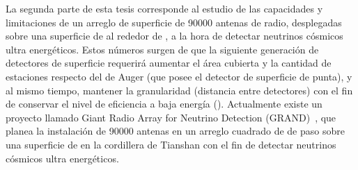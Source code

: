 La segunda parte de esta tesis corresponde al estudio de las capacidades y limitaciones de un arreglo de superficie de 90000 antenas de radio, desplegadas sobre una superficie de al rededor de , a la hora de detectar neutrinos cósmicos ultra energéticos.
Estos números surgen de que la siguiente generación de detectores de superficie requerir\'a aumentar el área cubierta y la cantidad de estaciones respecto del de Auger (que posee el detector de superficie de punta), y al mismo tiempo, mantener la granularidad (distancia entre detectores) con el fin de conservar el nivel de eficiencia a baja energ\'ia ().
Actualmente existe un proyecto llamado Giant Radio Array for Neutrino Detection (GRAND)~\cite{cite:grand_prop}, que planea la instalaci\'on de 90000 antenas en un arreglo cuadrado de  de paso sobre una superficie de  en la cordillera de Tianshan \cite{cite:grand_tec} con el fin de detectar neutrinos c\'osmicos ultra energ\'eticos.

